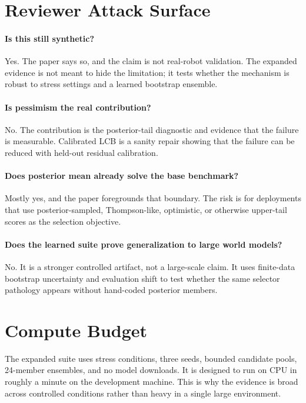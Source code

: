 \documentclass{article}
\begin{document}
\section{Reviewer Attack Surface}

\paragraph{Is this still synthetic?}
Yes. The paper says so, and the claim is not real-robot validation. The
expanded evidence is not meant to hide the limitation; it tests whether the mechanism is
robust to stress settings and a learned bootstrap ensemble.

\paragraph{Is pessimism the real contribution?}
No. The contribution is the posterior-tail diagnostic and evidence that the
failure is measurable. Calibrated LCB is a sanity repair showing that the
failure can be reduced with held-out residual calibration.

\paragraph{Does posterior mean already solve the base benchmark?}
Mostly yes, and the paper foregrounds that boundary. The risk is for
deployments that use posterior-sampled, Thompson-like, optimistic, or otherwise
upper-tail scores as the selection objective.

\paragraph{Does the learned suite prove generalization to large world models?}
No. It is a stronger controlled artifact, not a large-scale claim. It uses
finite-data bootstrap uncertainty and evaluation shift to test whether the same
selector pathology appears without hand-coded posterior members.

\section{Compute Budget}

The expanded suite uses \VThreeStressConditions{} stress conditions, three seeds,
bounded candidate pools, 24-member ensembles, and no model downloads. It is
designed to run on CPU in roughly a minute on the development machine. This is
why the evidence is broad across controlled conditions rather than heavy in a
single large environment.
\end{document}
